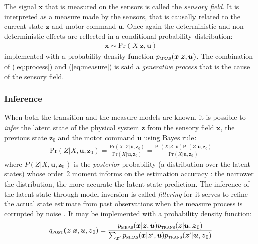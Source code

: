 \documentclass[12pt,twoside,openright]{article}
\begin{document}
The signal $\boldsymbol{x}$ that is measured on the sensors is called the \emph{sensory field}. It is interpreted as a measure made by the sensors, that is causally related to the current state $\boldsymbol{z}$ and motor command $\boldsymbol{u}$. Once again the deterministic and non-deterministic effects are reflected in a conditional probability distribution:
\begin{align}
\boldsymbol{x} \sim \text{Pr}(X|\boldsymbol{z},\boldsymbol{u})\label{eq:measure}
\end{align}
implemented with a probability density function 
$p_\text{\sc meas}(\boldsymbol{x}|\boldsymbol{z},\boldsymbol{u})$.
The combination of  (\ref{eq:process}) and (\ref{eq:measure}) is said a \emph{generative process} that is the cause of the sensory field. 


\subsubsection{Inference}

When both the transition and the measure models are known, it is possible to \emph{infer} the latent state of the physical system $\boldsymbol{z}$ from the sensory field $\boldsymbol{x}$, the previous state $\boldsymbol{z}_0$ and the motor command $\boldsymbol{u}$ using Bayes rule:
\begin{align}
\text{Pr}(Z|X,\boldsymbol{u},\boldsymbol{z}_0) = \frac{\text{Pr}(X,Z|\boldsymbol{u},\boldsymbol{z}_0)}{\text{Pr}(X|\boldsymbol{u},\boldsymbol{z}_0)} %
= \frac{\text{Pr}(X|Z,\boldsymbol{u}) \text{Pr}(Z|\boldsymbol{u},\boldsymbol{z}_0)}
{\text{Pr}(X|\boldsymbol{u},\boldsymbol{z}_0)}\label{eq:post-Pr}
\end{align}
where $P(Z|X,\boldsymbol{u},\boldsymbol{z}_0)$ is the \emph{posterior} probability (a distribution over the latent states) whose order 2 moment informs on the estimation accuracy : the narrower the distribution, the more accurate the latent state prediction. 
The inference of the latent state through model inversion is called \emph{filtering} for it serves to refine the actual state estimate from past observations when the measure process is corrupted by noise \cite{Kalman1960}.
It may be implemented with a probability density function:
\begin{align}
q_\text{\sc post}(\boldsymbol{z}|\boldsymbol{x},\boldsymbol{u}, \boldsymbol{z}_0) 
= \frac{p_\text{\sc meas}(\boldsymbol{x}|\boldsymbol{z},\boldsymbol{u}) p_\text{\sc trans}(\boldsymbol{z}|\boldsymbol{u},\boldsymbol{z}_0)}
{\sum_{\boldsymbol{z}'}p_\text{\sc meas}(\boldsymbol{x}|\boldsymbol{z}',\boldsymbol{u}) p_\text{\sc trans}(\boldsymbol{z}'|\boldsymbol{u},\boldsymbol{z}_0)}\label{eq:post-pdf}
\end{align}
\end{document}

